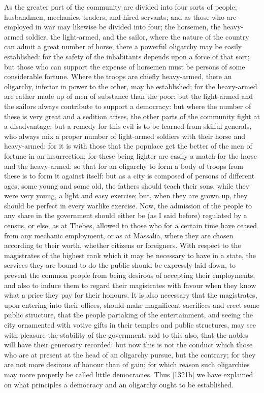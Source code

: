 As the greater part of the community are divided into four sorts of
people; husbandmen, mechanics, traders, and hired servants; and as those
who are employed in war may likewise be divided into four; the horsemen,
the heavy-armed soldier, the light-armed, and the sailor, where the nature
of the country can admit a great number of horse; there a powerful
oligarchy may be easily established: for the safety of the inhabitants
depends upon a force of that sort; but those who can support the expense
of horsemen must be persons of some considerable fortune. Where the troops
are chiefly heavy-armed, there an oligarchy, inferior in power to the
other, may be established; for the heavy-armed are rather made up of men
of substance than the poor: but the light-armed and the sailors always
contribute to support a democracy: but where the number of these is very
great and a sedition arises, the other parts of the community fight at a
disadvantage; but a remedy for this evil is to be learned from skilful
generals, who always mix a proper number of light-armed soldiers with
their horse and heavy-armed: for it is with those that the populace get
the better of the men of fortune in an insurrection; for these being
lighter are easily a match for the horse and the heavy-armed: so that for
an oligarchy to form a body of troops from these is to form it against
itself: but as a city is composed of persons of different ages, some young
and some old, the fathers should teach their sons, while they were very
young, a light and easy exercise; but, when they are grown up, they should
be perfect in every warlike exercise. Now, the admission of the people to
any share in the government should either be (as I said before) regulated
by a census, or else, as at Thebes, allowed to those who for a certain
time have ceased from any mechanic employment, or as at Massalia, where
they are chosen according to their worth, whether citizens or foreigners.
With respect to the magistrates of the highest rank which it may be
necessary to have in a state, the services they are bound to do the public
should be expressly laid down, to prevent the common people from being
desirous of accepting their employments, and also to induce them to regard
their magistrates with favour when they know what a price they pay for
their honours. It is also necessary that the magistrates, upon entering
into their offices, should make magnificent sacrifices and erect some
public structure, that the people partaking of the entertainment, and
seeing the city ornamented with votive gifts in their temples and public
structures, may see with pleasure the stability of the government: add to
this also, that the nobles will have their generosity recorded: but now
this is not the conduct which those who are at present at the head of an
oligarchy pursue, but the contrary; for they are not more desirous of
honour than of gain; for which reason such oligarchies may more properly
be called little democracies. Thus [1321b] we have explained on what
principles a democracy and an oligarchy ought to be established.

